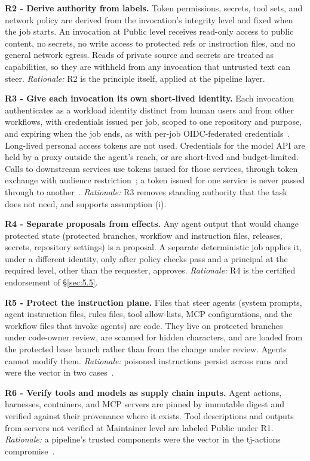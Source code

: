 \documentclass[acmsmall,screen,review]{acmart}
\begin{document}
\textbf{R2 - Derive authority from labels.} Token permissions, secrets, tool sets, and network policy are derived from the invocation's integrity level and fixed when the job starts. An invocation at Public level receives read-only access to public content, no secrets, no write access to protected refs or instruction files, and no general network egress. Reads of private source and secrets are treated as capabilities, so they are withheld from any invocation that untrusted text can steer. \emph{Rationale:} R2 is the principle itself, applied at the pipeline layer.

\textbf{R3 - Give each invocation its own short-lived identity.} Each invocation authenticates as a workload identity distinct from human users and from other workflows, with credentials issued per job, scoped to one repository and purpose, and expiring when the job ends, as with per-job OIDC-federated credentials~\cite{githubndopenid}. Long-lived personal access tokens are not used. Credentials for the model API are held by a proxy outside the agent's reach, or are short-lived and budget-limited. Calls to downstream services use tokens issued for those services, through token exchange with audience restriction~\cite{jones2020oauth}; a token issued for one service is never passed through to another~\cite{model2025security}. \emph{Rationale:} R3 removes standing authority that the task does not need, and supports assumption (i).

\textbf{R4 - Separate proposals from effects.} Any agent output that would change protected state (protected branches, workflow and instruction files, releases, secrets, repository settings) is a proposal. A separate deterministic job applies it, under a different identity, only after policy checks pass and a principal at the required level, other than the requester, approves. \emph{Rationale:} R4 is the certified endorsement of \S\ref{sec:5.5}.

\textbf{R5 - Protect the instruction plane.} Files that steer agents (system prompts, agent instruction files, rules files, tool allow-lists, MCP configurations, and the workflow files that invoke agents) are code. They live on protected branches under code-owner review, are scanned for hidden characters, and are loaded from the protected base branch rather than from the change under review. Agents cannot modify them. \emph{Rationale:} poisoned instructions persist across runs and were the vector in two cases~\cite{pillar2025new,amazon2025security}.

\textbf{R6 - Verify tools and models as supply chain inputs.} Agent actions, harnesses, containers, and MCP servers are pinned by immutable digest and verified against their provenance where it exists. Tool descriptions and outputs from servers not verified at Maintainer level are labeled Public under R1. \emph{Rationale:} a pipeline's trusted components were the vector in the tj-actions compromise~\cite{stepsecurity2025harden}.
\end{document}
